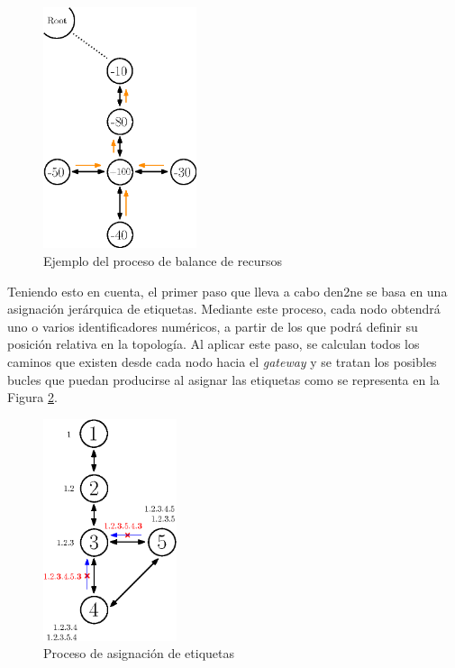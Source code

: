\vspace{3mm}

\begin{figure}[H]
  \centering
  \includegraphics[width=0.4\textwidth]{img/teoria/fig2.eps}
  \caption{Ejemplo del proceso de balance de recursos \cite{den2ne}}
  \label{fig:balance}
\end{figure}

\vspace{3mm}

Teniendo esto en cuenta, el primer paso que lleva a cabo \gls{den2ne} se basa en una asignación jerárquica de etiquetas. Mediante este proceso, cada nodo obtendrá uno o varios identificadores numéricos, a partir de los que podrá definir su posición relativa en la topología. Al aplicar este paso, se calculan todos los caminos que existen desde cada nodo hacia el \textit{gateway} y se tratan los posibles bucles que puedan producirse al asignar las etiquetas como se representa en la Figura \ref{fig:bucle}.

\vspace{3mm}

\begin{figure}[h!]
  \centering
  \includegraphics[width=0.35\textwidth]{img/teoria/fig4.eps}
  \caption{Proceso de asignación de etiquetas \cite{den2ne}}
  \label{fig:bucle}
\end{figure}


